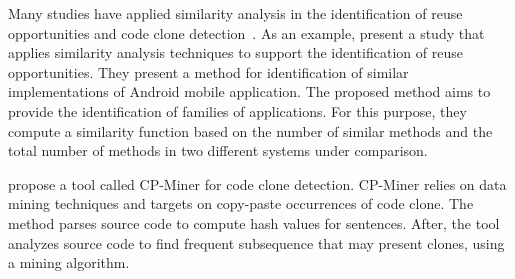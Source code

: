 Many studies have applied similarity analysis in the identification of reuse opportunities and code clone detection~\citep{li2016mining,marcus2001identification,roy2008nicad,selim2010enhancing,yuan2012boreas}. As an example, \cite{li2016mining} present a study that applies similarity analysis techniques to support the identification of reuse opportunities. They present a method for identification of similar implementations of Android mobile application. The proposed method aims to provide the identification of families of applications. For this purpose, they compute a similarity function based on the number of similar methods and the total number of methods in two different systems under comparison. 



\cite{li2006cp} propose a tool called CP-Miner for code clone detection. CP-Miner relies on data mining techniques and targets on copy-paste occurrences of code clone. The method parses source code to compute hash values for sentences. After, the tool analyzes source code to find frequent subsequence that may present clones, using a mining algorithm.




